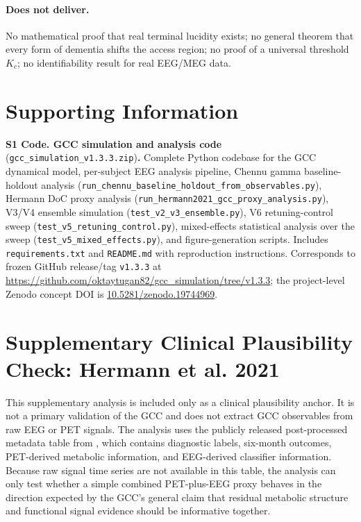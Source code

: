 \documentclass[11pt,a4paper]{article}
\theoremstyle{plain}
\theoremstyle{definition}
\theoremstyle{remark}
\begin{document}
\paragraph{Does not deliver.}
No mathematical proof that real terminal lucidity exists; no general theorem that every form of dementia shifts the access region; no proof of a universal threshold $K_c$; no identifiability result for real EEG/MEG data.


\section*{Supporting Information}

\begin{sloppypar}
\noindent\textbf{S1 Code. GCC simulation and analysis code} (\texttt{gcc\_simulation\_v1.3.3.zip})\textbf{.} Complete Python codebase for the GCC dynamical model, per-subject EEG analysis pipeline, Chennu gamma baseline-holdout analysis (\texttt{run\_chennu\_baseline\_holdout\_from\_observables.py}), Hermann DoC proxy analysis (\texttt{run\_hermann2021\_gcc\_proxy\_analysis.py}), V3/V4 ensemble simulation (\texttt{test\_v2\_v3\_ensemble.py}), V6 retuning-control sweep (\texttt{test\_v5\_retuning\_control.py}), mixed-effects statistical analysis over the sweep (\texttt{test\_v5\_mixed\_effects.py}), and figure-generation scripts. Includes \texttt{requirements.txt} and \texttt{README.md} with reproduction instructions. Corresponds to frozen GitHub release/tag \texttt{v1.3.3} at \url{https://github.com/oktaytugan82/gcc_simulation/tree/v1.3.3}; the project-level Zenodo concept DOI is \href{https://doi.org/10.5281/zenodo.19744969}{10.5281/zenodo.19744969}.
\end{sloppypar}



\section*{Supplementary Clinical Plausibility Check: Hermann et al. 2021}

\noindent This supplementary analysis is included only as a clinical plausibility anchor. It is not a primary validation of the GCC and does not extract GCC observables from raw EEG or PET signals. The analysis uses the publicly released post-processed metadata table from \citet{hermann2021}, which contains diagnostic labels, six-month outcomes, PET-derived metabolic information, and EEG-derived classifier information. Because raw signal time series are not available in this table, the analysis can only test whether a simple combined PET-plus-EEG proxy behaves in the direction expected by the GCC's general claim that residual metabolic structure and functional signal evidence should be informative together.
\end{document}

